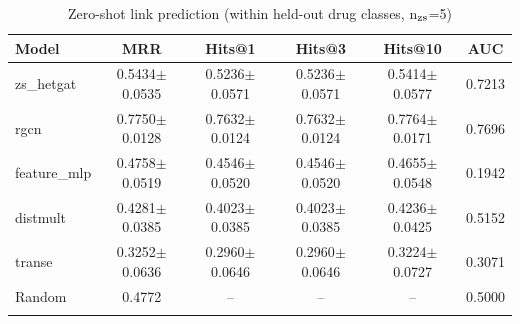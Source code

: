 \begin{table}[t]
\centering
\caption{Zero-shot link prediction (within held-out drug classes, n$_{\rm zs}$=5)}
\label{tab:zeroshot}
\begin{tabular}{lccccc}
\toprule
\textbf{Model} & \textbf{MRR} & \textbf{Hits@1} & \textbf{Hits@3} & \textbf{Hits@10} & \textbf{AUC} \\
\midrule
zs\_hetgat & 0.5434$\pm$0.0535 & 0.5236$\pm$0.0571 & 0.5236$\pm$0.0571 & 0.5414$\pm$0.0577 & 0.7213 \\
rgcn & 0.7750$\pm$0.0128 & 0.7632$\pm$0.0124 & 0.7632$\pm$0.0124 & 0.7764$\pm$0.0171 & 0.7696 \\
feature\_mlp & 0.4758$\pm$0.0519 & 0.4546$\pm$0.0520 & 0.4546$\pm$0.0520 & 0.4655$\pm$0.0548 & 0.1942 \\
distmult & 0.4281$\pm$0.0385 & 0.4023$\pm$0.0385 & 0.4023$\pm$0.0385 & 0.4236$\pm$0.0425 & 0.5152 \\
transe & 0.3252$\pm$0.0636 & 0.2960$\pm$0.0646 & 0.2960$\pm$0.0646 & 0.3224$\pm$0.0727 & 0.3071 \\
Random & 0.4772 & -- & -- & -- & 0.5000 \\ \\
\bottomrule
\end{tabular}
\end{table}
